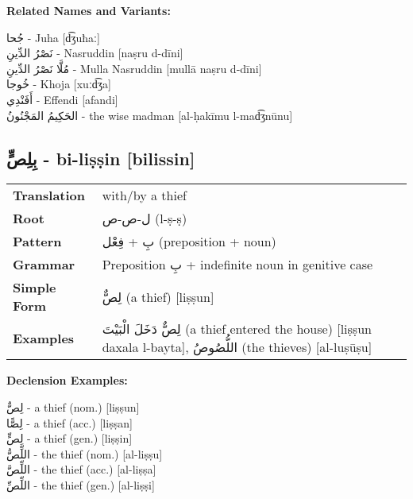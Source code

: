 \documentclass[a4paper,12pt]{article}
\begin{document}
\textbf{Related Names and Variants:}
\begin{multicols}{2}
\small
\textarabic{جُحا} - Juha [d͡ʒuħaː]\\
\textarabic{نَصْرُ الدِّينِ} - Nasruddin [naṣru d-dīni]\\
\textarabic{مُلَّا نَصْرُ الدِّينِ} - Mulla Nasruddin [mullā naṣru d-dīni]\\
\textarabic{خُوجا} - Khoja [xuːd͡ʒa]\\
\textarabic{أَفَنْدِي} - Effendi [afandi]\\
\textarabic{الحَكِيمُ المَجْنُونُ} - the wise madman [al-ḥakīmu l-mad͡ʒnūnu]
\end{multicols}

\subsection{\textarabic{بِلِصٍّ} - \textbf{bi-liṣṣin} [bilissin]}

\begin{tabular}{p{3cm}p{10cm}}
\toprule
\textbf{Translation} & with/by a thief \\
\textbf{Root} & \textarabic{ل-ص-ص} (l-ṣ-ṣ) \\
\textbf{Pattern} & \textarabic{بِ} + \textarabic{فِعْل} (preposition + noun) \\
\textbf{Grammar} & Preposition \textarabic{بِ} + indefinite noun in genitive case \\
\textbf{Simple Form} & \textarabic{لِصٌّ} (a thief) [liṣṣun] \\
\textbf{Examples} & \textarabic{لِصٌّ دَخَلَ الْبَيْتَ} (a thief entered the house) [liṣṣun daxala l-bayta], \textarabic{اللُّصُوصُ} (the thieves) [al-luṣūṣu] \\
\bottomrule
\end{tabular}

\textbf{Declension Examples:}
\begin{multicols}{2}
\small
\textarabic{لِصٌّ} - a thief (nom.) [liṣṣun]\\
\textarabic{لِصًّا} - a thief (acc.) [liṣṣan]\\
\textarabic{لِصٍّ} - a thief (gen.) [liṣṣin]\\
\textarabic{اللِّصُّ} - the thief (nom.) [al-liṣṣu]\\
\textarabic{اللِّصَّ} - the thief (acc.) [al-liṣṣa]\\
\textarabic{اللِّصِّ} - the thief (gen.) [al-liṣṣi]
\end{multicols}
\end{document}
